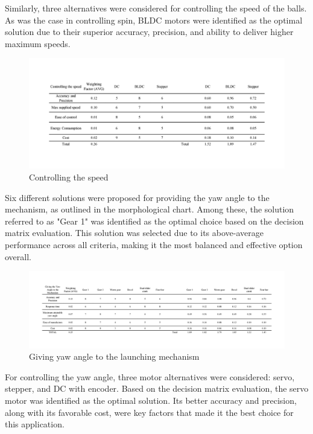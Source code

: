 \documentclass[12pt]{report}
\begin{document}
Similarly, three alternatives were considered for controlling the speed of the balls. As was the case in controlling spin, BLDC motors were identified as the optimal solution due to their superior accuracy, precision, and ability to deliver higher maximum speeds.
\begin{figure}[H]
    \centering
    \includegraphics[width=1\textwidth]{Decision matrices/controlling speed.png}
    \caption{Controlling the speed}
\end{figure}

Six different solutions were proposed for providing the yaw angle to the mechanism, as outlined in the morphological chart. Among these, the solution referred to as "Gear 1" was identified as the optimal choice based on the decision matrix evaluation. This solution was selected due to its above-average performance across all criteria, making it the most balanced and effective option overall.

\begin{figure}[H]
    \centering
    \includegraphics[width=1\textwidth]{Decision matrices/yaw.png}
    \caption{Giving yaw angle to the launching mechanism}
\end{figure}

For controlling the yaw angle, three motor alternatives were considered: servo, stepper, and DC with encoder. Based on the decision matrix evaluation, the servo motor was identified as the optimal solution. Its better accuracy and precision, along with its favorable cost, were key factors that made it the best choice for this application.
\end{document}
